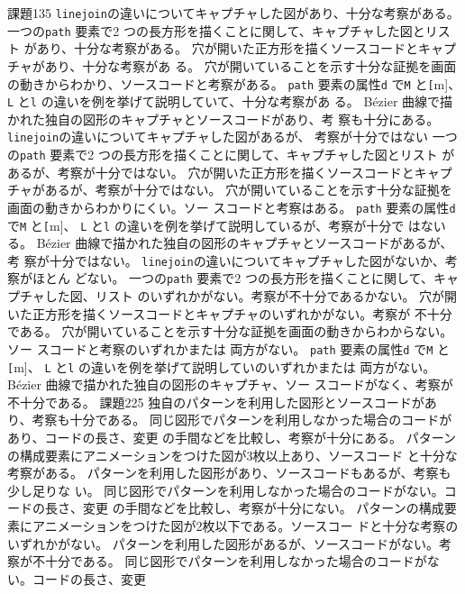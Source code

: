 \documentclass[a4j]{jreport}
\begin{document}
{{課題1}{35}
  {
	{\texttt{linejoin}の違いについてキャプチャした図があり、十分な考察がある。}
	{一つの\texttt{path} 要素で2 つの長方形を描くことに関して、キャプチャした図とリスト
	があり、十分な考察がある。}
	{穴が開いた正方形を描くソースコードとキャプチャがあり、十分な考察があ
	る。}
	{穴が開いていることを示す十分な証拠を画面の動きからわかり、ソースコードと考察がある。}
	{\texttt{path} 要素の属性\texttt{d} で\texttt{M} と\texttt[m]、
	\texttt{L} と\texttt{l} の違いを例を挙げて説明していて、十分な考察があ
	る。}
	{B\'ezier 曲線で描かれた独自の図形のキャプチャとソースコードがあり、考
	察も十分にある。}
	}
	{
	{\texttt{linejoin}の違いについてキャプチャした図があるが、
考察が十分ではない}
	{一つの\texttt{path} 要素で2 つの長方形を描くことに関して、キャプチャした図とリスト
	があるが、考察が十分ではない。}
	{穴が開いた正方形を描くソースコードとキャプチャがあるが、考察が十分ではない。}
	{穴が開いていることを示す十分な証拠を画面の動きからわかりにくい。ソー
	スコードと考察はある。}
	{\texttt{path} 要素の属性\texttt{d} で\texttt{M} と\texttt[m]、
	\texttt{L} と\texttt{l} の違いを例を挙げて説明しているが、考察が十分で
	はないる。}
	{B\'ezier 曲線で描かれた独自の図形のキャプチャとソースコードがあるが、考
	察が十分ではない。}
	}
	{
	{\texttt{linejoin}の違いについてキャプチャした図がないか、考察がほとん
	どない。}
	{一つの\texttt{path} 要素で2 つの長方形を描くことに関して、キャプチャした図、リスト
	のいずれかがない。考察が不十分であるかない。}
	{穴が開いた正方形を描くソースコードとキャプチャのいずれかがない。考察が
不十分である。}
	{穴が開いていることを示す十分な証拠を画面の動きからわからない。ソー
	スコードと考察のいずれかまたは
両方がない。}
	{\texttt{path} 要素の属性\texttt{d} で\texttt{M} と\texttt[m]、
	\texttt{L} と\texttt{l} の違いを例を挙げて説明していのいずれかまたは
両方がない。}
	{B\'ezier 曲線で描かれた独自の図形のキャプチャ、ソー
スコードがなく、考察が不十分である。}
	}
	{課題2}{25}
	{
	{独自のパターンを利用した図形とソースコードがあり、考察も十分である。}
	{同じ図形でパターンを利用しなかった場合のコードがあり、コードの長さ、変更
	の手間などを比較し、考察が十分にある。}
	{パターンの構成要素にアニメーションをつけた図が3枚以上あり、ソースコード
と十分な考察がある。}
	}
	{
	{パターンを利用した図形があり、ソースコードもあるが、考察も少し足りな
	い。}
	{同じ図形でパターンを利用しなかった場合のコードがない。コードの長さ、変更
の手間などを比較し、考察が十分にない。}
	{パターンの構成要素にアニメーションをつけた図が2枚以下である。ソースコー
ドと十分な考察のいずれかがない。}
	}
	{
	{パターンを利用した図形があるが、ソースコードがない。考察が不十分である。}
	{同じ図形でパターンを利用しなかった場合のコードがない。コードの長さ、変更
}}}
\end{document}
